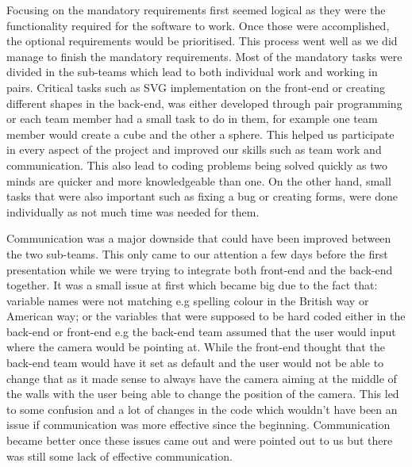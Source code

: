 \documentclass[a4paper]{article}
\begin{document}
	Focusing on the mandatory requirements first seemed logical as they were the functionality required for the software to work. Once those were accomplished, the optional requirements would be prioritised. This process went well as we did manage to finish the mandatory requirements. Most of the mandatory tasks were divided in the sub-teams which lead to both individual work and working in pairs. Critical tasks such as SVG implementation on the front-end or creating different shapes in the back-end, was either developed through pair programming or each team member had a small task to do in them, for example one team member would create a cube and the other a sphere. This helped us participate in every aspect of the project and improved our skills such as  team work and communication. This also lead to  coding problems being solved quickly as two minds are quicker and more knowledgeable than one. On the other hand, small tasks that were also important such as fixing a bug or creating forms, were done individually as not much time was needed for them. 
	
	Communication was a major downside that could have been improved between the two sub-teams. This only came to our attention a few days before the first presentation while we were trying to integrate both front-end and the back-end together. It was a small issue at first which became big due to the fact that: variable names were not matching e.g spelling colour in the British way or American way; or the variables that were supposed to be hard coded either in the back-end or front-end e.g the back-end team assumed that the user would input where the camera would be pointing at. While the front-end thought that the back-end team would have it set as default and the user would not be able to change that as it made sense to always have the camera aiming at the middle of the walls with the user being able to change the position of the camera. This led to some confusion and a lot of changes in the code which wouldn't have been an issue if communication was more effective since the beginning. Communication became better once these issues came out and were pointed out to us but there was still some lack of effective communication.
	
	
	
\end{document}

